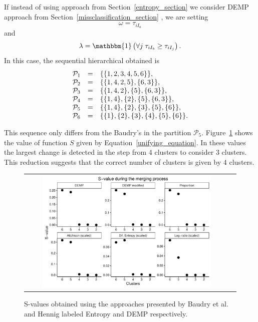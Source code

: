 \documentclass[submit]{smj}
\theoremstyle{definition}
\begin{document}
If instead of using approach from Section~\ref{entropy_section} \citep{baudry2010combining} we consider DEMP approach from Section~\ref{missclassification_section} \citep{hennig2010methods}, we are setting \[\omega = \tau_{i I_a}\] and \[\lambda = \mathbbm{1}\left( \forall j\; \tau_{i I_{b}} \geq \tau_{iI_j} \right).\] In this case, the sequential hierarchical obtained is
\begin{equation}
\begin{array}{r c l}
\mathcal{P}_1 &=& \{\{1, 2, 3, 4, 5, 6\}\}, \\
\mathcal{P}_2 &=& \{\{1, 4, 2, 5\}, \{6, 3\} \},  \\
\mathcal{P}_3 &=& \{\{1, 4, 2\}, \{5\}, \{6, 3\} \}, \\
\mathcal{P}_4 &=& \{\{1, 4\},\{2\}, \{5\}, \{6, 3\} \}, \\
\mathcal{P}_5 &=& \{\{1, 4\},\{2\}, \{3\},\{5\},\{6\} \},\\
\mathcal{P}_6 &=& \{\{1\},\{2\},\{3\},\{4\},\{5\},\{6\}\}.
\end{array}
\end{equation}



This sequence only differs from the Baudry's in the partition $\mathcal{P}_5$.  Figure~\ref{gaussian_Svalues} shows the value of function $S$ given by Equation~\ref{unifying_equation}. In these values the largest change is detected in the step from 4 clusters to consider 3 clusters. This reduction suggests that the correct number of clusters is given by 4 clusters.
\begin{figure}[t]
\begin{center}
\begin{tabular}{cc}
  \includegraphics[width=0.85\textwidth]{figures/gaussian_Svalues.pdf} \\
 \end{tabular}
 \caption{S-values obtained using the approaches presented by Baudry et al. and Hennig labeled Entropy and DEMP respectively.}\label{gaussian_Svalues}
\end{center}
\end{figure}
\end{document}
